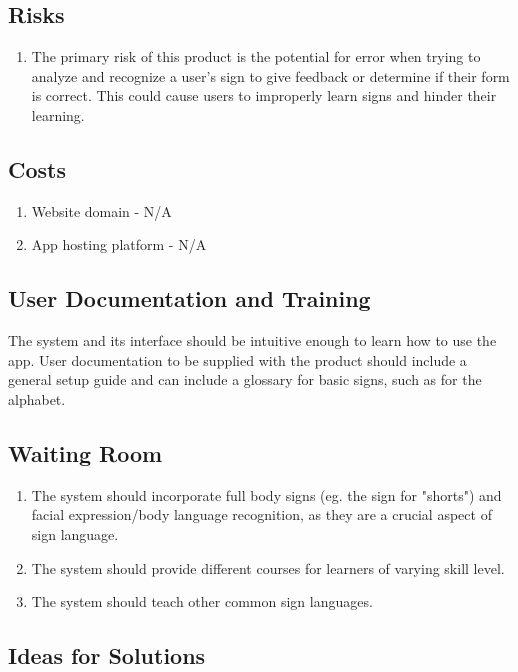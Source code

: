 \documentclass[12pt, titlepage]{article}
\begin{document}
\subsection{Risks}

\begin{enumerate}
    \item The primary risk of this product is the potential for error when trying to analyze and recognize a user's sign to give feedback or determine if their form is correct. This could cause users to improperly learn signs and hinder their learning.
\end{enumerate}

\subsection{Costs}
\begin{enumerate}
    \item Website domain - N/A
    \item App hosting platform - N/A
\end{enumerate}

\subsection{User Documentation and Training}
The system and its interface should be intuitive enough to learn how to use the app. User documentation to be supplied with the product should include a general setup guide and can include a glossary for basic signs, such as for the alphabet.

\subsection{Waiting Room}
\begin{enumerate}
    \item The system should incorporate full body signs (eg. the sign for "shorts") and facial expression/body language recognition, as they are a crucial aspect of sign language.
    \item The system should provide different courses for learners of varying skill level.
    \item The system should teach other common sign languages.
\end{enumerate}

\subsection{Ideas for Solutions}
\end{document}
